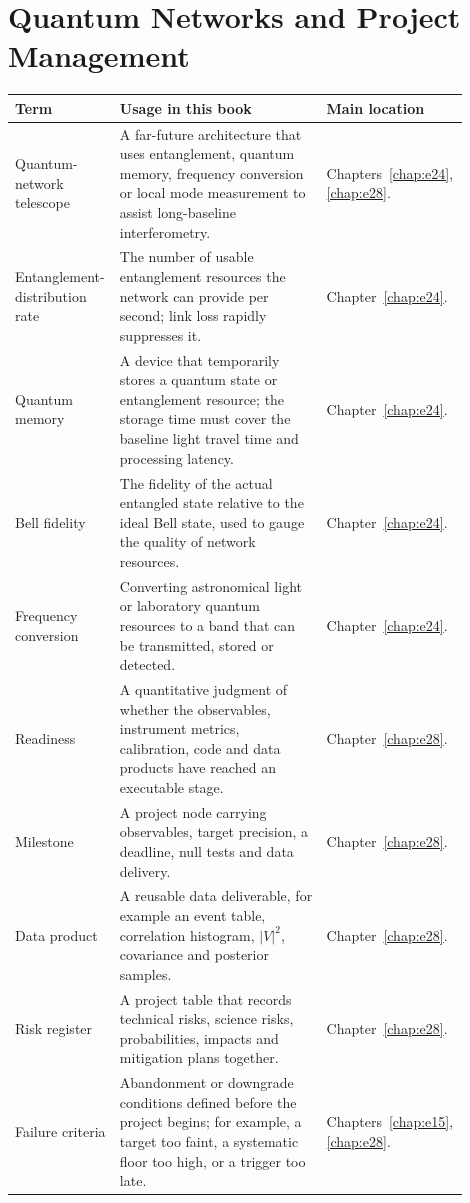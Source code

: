 \section{Quantum Networks and Project Management}
\label{appsec:c-program}

\begin{longtable}{p{0.20\linewidth}p{0.45\linewidth}p{0.25\linewidth}}
\toprule
Term & Usage in this book & Main location \\
\midrule
Quantum-network telescope & A far-future architecture that uses entanglement, quantum memory, frequency conversion or local mode measurement to assist long-baseline interferometry. & Chapters~\ref{chap:e24}, \ref{chap:e28}. \\
Entanglement-distribution rate & The number of usable entanglement resources the network can provide per second; link loss rapidly suppresses it. & Chapter~\ref{chap:e24}. \\
Quantum memory & A device that temporarily stores a quantum state or entanglement resource; the storage time must cover the baseline light travel time and processing latency. & Chapter~\ref{chap:e24}. \\
Bell fidelity & The fidelity of the actual entangled state relative to the ideal Bell state, used to gauge the quality of network resources. & Chapter~\ref{chap:e24}. \\
Frequency conversion & Converting astronomical light or laboratory quantum resources to a band that can be transmitted, stored or detected. & Chapter~\ref{chap:e24}. \\
Readiness & A quantitative judgment of whether the observables, instrument metrics, calibration, code and data products have reached an executable stage. & Chapter~\ref{chap:e28}. \\
Milestone & A project node carrying observables, target precision, a deadline, null tests and data delivery. & Chapter~\ref{chap:e28}. \\
Data product & A reusable data deliverable, for example an event table, correlation histogram, \(|V|^2\), covariance and posterior samples. & Chapter~\ref{chap:e28}. \\
Risk register & A project table that records technical risks, science risks, probabilities, impacts and mitigation plans together. & Chapter~\ref{chap:e28}. \\
Failure criteria & Abandonment or downgrade conditions defined before the project begins; for example, a target too faint, a systematic floor too high, or a trigger too late. & Chapters~\ref{chap:e15}, \ref{chap:e28}. \\
\bottomrule
\end{longtable}
